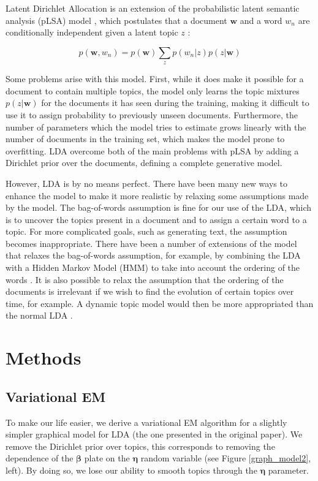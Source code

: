 \documentclass{article}
\begin{document}
Latent Dirichlet Allocation is an extension of the probabilistic latent semantic analysis (pLSA) model \cite{hofmann1999probabilistic}, which postulates that a document $\mathbf{w}$ and a word $w_{n}$ are conditionally independent given a latent topic $z$ :

\begin{equation*}
p(\mathbf{w},w_{n}) = p(\mathbf{w}) \sum_z p(w_n|z)p(z|\mathbf{w})
\end{equation*}

Some problems arise with this model. First, while it does make it possible for a document to contain multiple topics, the model only learns the topic mixtures $p(z|\mathbf{w})$ for the documents it has seen during the training, making it difficult to use it to assign probability to previously unseen documents. Furthermore, the number of parameters which the model tries to estimate grows linearly with the number of documents in the training set, which makes the model prone to overfitting. LDA overcome both of the main problems with pLSA by adding a Dirichlet prior over the documents, defining a complete generative model.

However, LDA is by no means perfect. There have been many new ways to enhance the model to make it more realistic by relaxing some assumptions made by the model. The bag-of-words assumption is fine for our use of the LDA, which is to uncover the topics present in a document and to assign a certain word to a topic. For more complicated goals, such as generating text, the assumption becomes inappropriate. There have been a number of extensions of the model that relaxes the bag-of-words assumption, for example, by combining the LDA with a Hidden Markov Model (HMM) to take into account the ordering of the words \cite{griffiths2005integrating}. It is also possible to relax the assumption that the ordering of the documents is irrelevant if we wish to find the evolution of certain topics over time, for example. A dynamic topic model would then be more appropriated than the normal LDA \cite{blei2006dynamic}.

\section{Methods}

\subsection{Variational EM}
To make our life easier, we derive a variational EM algorithm for a slightly simpler graphical model for LDA (the one presented in the original paper). We remove the Dirichlet prior over topics, this corresponds to removing the dependence of the $\bm{\beta}$ plate on the $\bm{\eta}$ random variable (see Figure \ref{graph_model2}, left). By doing so, we lose our ability to smooth topics through the $\bm{\eta}$ parameter.
\end{document}
